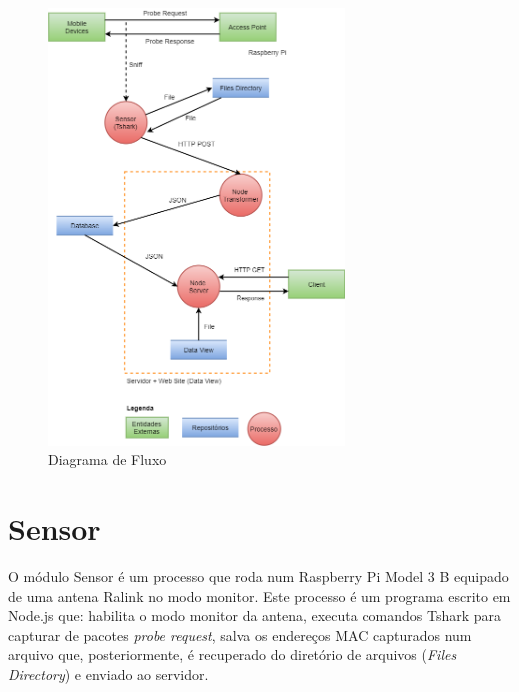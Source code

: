 \begin{figure}[!h]
  \caption{\label{diagrama-fluxo}Diagrama de Fluxo}
  \begin{center}
    \includegraphics[width=0.70\textwidth]{img/diagrama_fluxo.png}
  \end{center}
\end{figure}


\section{Sensor}
\label{secao-sensor}
O módulo Sensor é um processo que roda num Raspberry Pi Model 3 B equipado de
uma antena Ralink no modo monitor. Este processo é um programa escrito em
Node.js que: habilita o modo monitor da antena, executa comandos Tshark para capturar de pacotes
\emph{probe request}, salva os endereços MAC
capturados num arquivo que, posteriormente, é recuperado do diretório de
arquivos (\emph{Files Directory}) e enviado ao servidor.


